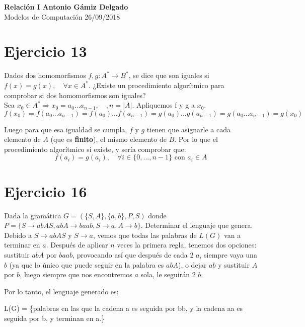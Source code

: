 \documentclass[a4paper, 11pt]{article}
\begin{document}
\noindent
\large\textbf{Relación I} \hfill \textbf{Antonio Gámiz Delgado} \\
\normalsize Modelos de Computación \hfill 26/09/2018

\section*{Ejercicio 13}

Dados dos homomorfismos $f,g: A^* \longrightarrow B^*$, se dice que son iguales si $f(x)=g(x), \quad \forall x \in A^*$. ¿Existe un procedimiento algorítmico para comprobar si dos homomorfismos son iguales? \\

Sea $x_0 \in A^* \Longrightarrow x_0=a_0...a_{n-1}, \quad, n=|A|$. Apliquemos f y g a $x_0$.
\[f(x_0)=f(a_0...a_{n-1})=f(a_0)...f(a_{n-1})=g(a_0)...g(a_{n-1})=g(a_0...a_{n-1})=g(x_0)\]

Luego para que esa igualdad se cumpla, $f$ y $g$ tienen que asignarle a cada elemento de $A$ (que es \textbf{finito}), el mismo elemento de $B$. Por lo que el procedimiento algorítmico si existe, y sería comprobar que:
\[f(a_i)=g(a_i), \quad \forall i \in \{0,...,n-1\} \text{ con } a_i\in A\]
\section*{Ejercicio 16}
Dada la gramática $G=(\{S,A\}, \{a,b\},P,S)$ donde $P = \{S \longrightarrow abAS, abA \longrightarrow baab, S \longrightarrow a, A \longrightarrow b \}.$ Determinar el lenguaje que genera. \\

Debido a $S \longrightarrow abAS$ y $S \longrightarrow a$, vemos que todas las palabras de $L(G)$ van a terminar en $a$. Después de aplicar $n$ veces la primera regla, tenemos dos opciones: sustituir $abA$ por $baab$, provocando así que después de cada 2 $a$, siempre vaya una $b$ (ya que lo único que puede seguir en la palabra es $abA$), o dejar $ab$ y sustituir $A$ por $b$, luego siempre que nos encontremos $a$ sola, le seguirán 2 $b$.

Por lo tanto, el lenguaje generado es:

L(G) = \{palabras en las que la cadena a es seguida por bb, y la cadena aa es seguida por b, y terminan en a.\}
\end{document}
